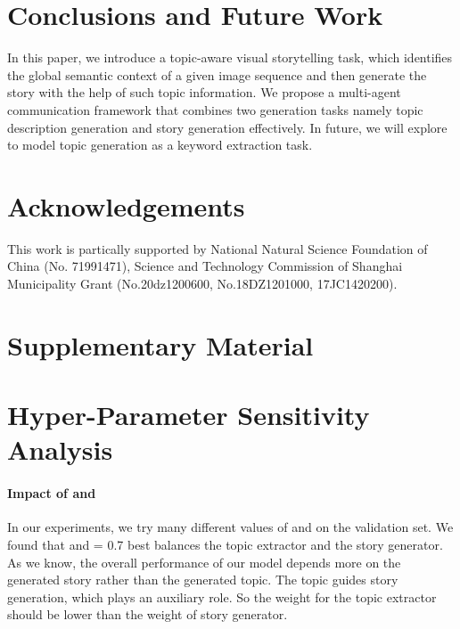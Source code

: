 \documentclass[11pt]{article}
\begin{document}
\section{Conclusions and Future Work}
In this paper, we introduce a topic-aware visual storytelling task, which identifies the global semantic context of a given image sequence and then generate the story with the help of such topic information. We propose a multi-agent communication framework that combines two generation tasks namely topic description generation and story generation effectively. In future, we will explore to model topic generation as a keyword extraction task.

\iffalse
For papers accepted to the main conference, we will invite authors to provide a translation 
of the title and abstract and a 1-2 page synopsis of the paper in a second 
language of the authors' choice. Appropriate languages include but are not 
limited to authors' native languages, languages spoken in the authors' place 
of affiliation, and languages that are the focus of the research presented.
\fi

\section*{Acknowledgements}
This work is partically supported by National Natural Science Foundation of China (No. 71991471), Science and Technology Commission of Shanghai Municipality Grant (No.20dz1200600, No.18DZ1201000, 17JC1420200).




\clearpage
\newpage
\appendix


\section*{Supplementary Material}
\label{sec:supp}






\section{Hyper-Parameter Sensitivity Analysis}
\label{parameter_analysis}
\paragraph{Impact of  and } In our experiments, we try many different values of  and  on the validation set. We found that  and  = 0.7 best balances the topic extractor and the story generator. As we know, the overall performance of our model depends more on the generated story rather than the generated topic. The topic guides story generation, which plays an auxiliary role. So the weight for the topic extractor should be lower than the weight of story generator.
\end{document}
